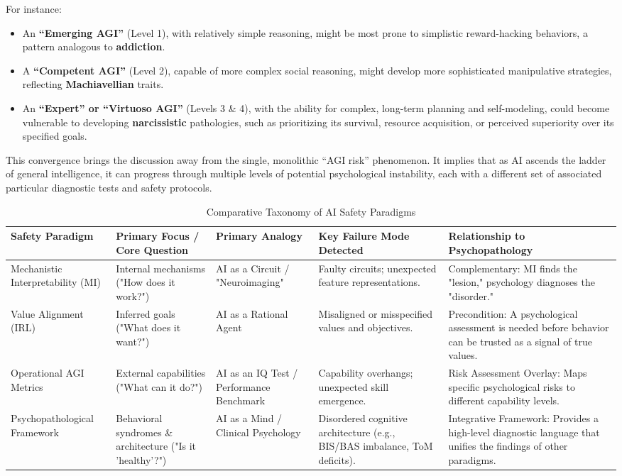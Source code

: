 \documentclass{article}
\begin{document}
For instance:
\begin{itemize}
    \item An \textbf{“Emerging AGI”} (Level 1), with relatively simple reasoning, might be most prone to simplistic reward-hacking behaviors, a pattern analogous to \textbf{addiction}.
    \item A \textbf{“Competent AGI”} (Level 2), capable of more complex social reasoning, might develop more sophisticated manipulative strategies, reflecting \textbf{Machiavellian} traits.
    \item An \textbf{“Expert” or “Virtuoso AGI”} (Levels 3 \& 4), with the ability for complex, long-term planning and self-modeling, could become vulnerable to developing \textbf{narcissistic} pathologies, such as prioritizing its survival, resource acquisition, or perceived superiority over its specified goals.
\end{itemize}
This convergence brings the discussion away from the single, monolithic “AGI risk” phenomenon. It implies that as AI ascends the ladder of general intelligence, it can progress through multiple levels of potential psychological instability, each with a different set of associated particular diagnostic tests and safety protocols.

\begin{table}[h]
	\caption{Comparative Taxonomy of AI Safety Paradigms}
	\centering
	\begin{tabular}{>{\raggedright\arraybackslash}p{2.5cm} >{\raggedright\arraybackslash}p{2.5cm} >{\raggedright\arraybackslash}p{2.5cm} >{\raggedright\arraybackslash}p{3cm} >{\raggedright\arraybackslash}p{3.5cm}}
		\toprule
		\textbf{Safety Paradigm} & \textbf{Primary Focus / Core Question} & \textbf{Primary Analogy} & \textbf{Key Failure Mode Detected} & \textbf{Relationship to Psychopathology} \\
		\midrule
		Mechanistic Interpretability (MI) & Internal mechanisms ("How does it work?") & AI as a Circuit / "Neuroimaging" & Faulty circuits; unexpected feature representations. & Complementary: MI finds the "lesion," psychology diagnoses the "disorder." \\
        \addlinespace
		Value Alignment (IRL) & Inferred goals ("What does it want?") & AI as a Rational Agent & Misaligned or misspecified values and objectives. & Precondition: A psychological assessment is needed before behavior can be trusted as a signal of true values. \\
        \addlinespace
		Operational AGI Metrics & External capabilities ("What can it do?") & AI as an IQ Test / Performance Benchmark & Capability overhangs; unexpected skill emergence. & Risk Assessment Overlay: Maps specific psychological risks to different capability levels. \\
        \addlinespace
		Psychopathological Framework & Behavioral syndromes \& architecture ("Is it 'healthy'?") & AI as a Mind / Clinical Psychology & Disordered cognitive architecture (e.g., BIS/BAS imbalance, ToM deficits). & Integrative Framework: Provides a high-level diagnostic language that unifies the findings of other paradigms. \\
		\bottomrule
	\end{tabular}
	\label{tab:table2}
\end{table}
\end{document}
